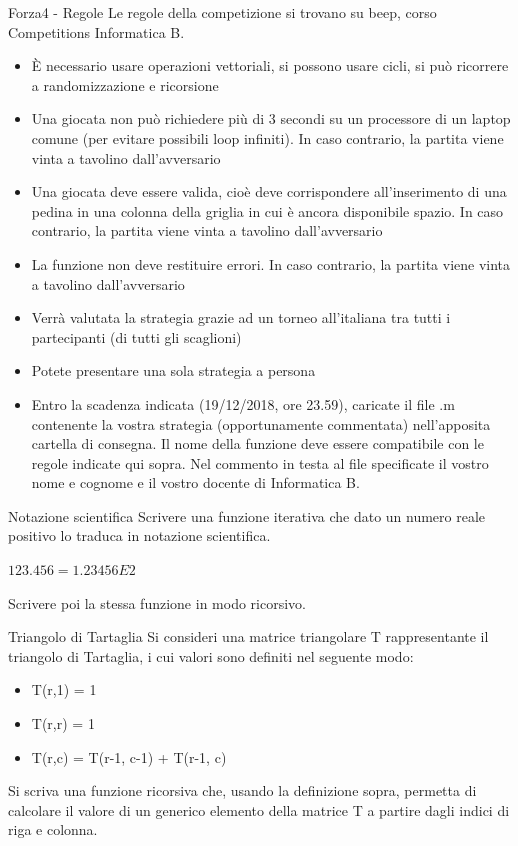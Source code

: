 \documentclass[format=169,]{beamer}
\begin{document}
\begin{frame}[allowframebreaks]{Forza4 - Regole}
Le regole della competizione si trovano su beep, corso Competitions Informatica B.

\begin{itemize}
\item È necessario usare operazioni vettoriali, si possono usare cicli, si può ricorrere a randomizzazione e ricorsione 
\item Una giocata non può richiedere più di 3 secondi su un processore di un laptop comune (per evitare possibili loop infiniti). In caso contrario, la partita viene vinta a tavolino dall'avversario 
\item Una giocata deve essere valida, cioè deve corrispondere all'inserimento di una pedina in una colonna della griglia in cui è ancora disponibile spazio. In caso contrario, la partita viene vinta a tavolino dall'avversario 
\item La funzione non deve restituire errori. In caso contrario, la partita viene vinta a tavolino dall'avversario 
\item Verrà valutata la strategia grazie ad un torneo all'italiana tra tutti i partecipanti (di tutti gli scaglioni)
\item Potete presentare una sola strategia a persona 
\item Entro la scadenza indicata (19/12/2018, ore 23.59), caricate il file .m contenente la vostra strategia (opportunamente commentata) nell'apposita cartella di consegna. Il nome della funzione deve essere compatibile con le regole indicate qui sopra. Nel commento in testa al file specificate il vostro nome e cognome e il vostro docente di Informatica B.  
\end{itemize}
\end{frame}

\begin{frame}{Notazione scientifica}
	Scrivere una funzione iterativa che dato un numero reale positivo lo traduca in notazione scientifica.
	
	$123.456 = 1.23456E2$
	
	Scrivere poi la stessa funzione in modo ricorsivo.
\end{frame}

\begin{frame}{Triangolo di Tartaglia}
	Si consideri una matrice triangolare T rappresentante il triangolo di Tartaglia, i cui valori sono definiti nel seguente modo:
	\begin{itemize}
		\item T(r,1) = 1
		\item T(r,r) = 1
		\item T(r,c) = T(r-1, c-1) + T(r-1, c)
	\end{itemize}

	Si scriva una funzione ricorsiva che, usando la definizione sopra, permetta di calcolare il valore di un generico elemento della matrice T a partire dagli indici di riga e colonna.
\end{frame}
\end{document}
